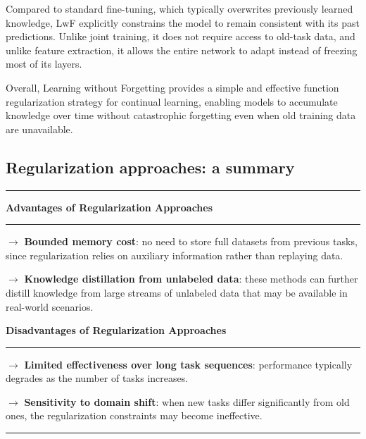 Compared to standard fine-tuning, which typically overwrites previously learned
knowledge, LwF explicitly constrains the model to remain consistent with its past
predictions. Unlike joint training, it does not require access to old-task data, and
unlike feature extraction, it allows the entire network to adapt instead of freezing
most of its layers.

Overall, Learning without Forgetting provides a simple and effective function
regularization strategy for continual learning, enabling models to accumulate knowledge
over time without catastrophic forgetting even when old training data are unavailable.

\subsection{Regularization approaches: a summary}
\vspace{0.3cm}

\begin{center}
    \hrule
    \vspace{0.3cm}
    
    \begin{minipage}[t]{0.47\textwidth}
    \centering
    \textbf{Advantages of Regularization Approaches}
    
    \vspace{0.2cm}
    \hrule
    \vspace{0.2cm}
    
    $\rightarrow$ \textbf{Bounded memory cost}: no need to store full datasets from previous tasks,
    since regularization relies on auxiliary information rather than replaying data.
    
    \vspace{0.15cm}
    
    $\rightarrow$ \textbf{Knowledge distillation from unlabeled data}: these methods can further
    distill knowledge from large streams of unlabeled data that may be available in real-world
    scenarios.
    
    \end{minipage}
    \hfill
    \begin{minipage}[t]{0.47\textwidth}
    \centering
    \textbf{Disadvantages of Regularization Approaches}
    
    \vspace{0.2cm}
    \hrule
    \vspace{0.2cm}
    
    $\rightarrow$ \textbf{Limited effectiveness over long task sequences}: performance typically
    degrades as the number of tasks increases.
    
    \vspace{0.15cm}
    
    $\rightarrow$ \textbf{Sensitivity to domain shift}: when new tasks differ significantly from old
    ones, the regularization constraints may become ineffective.
   
    \end{minipage}
    
    \vspace{0.3cm}
\hrule
\end{center}

